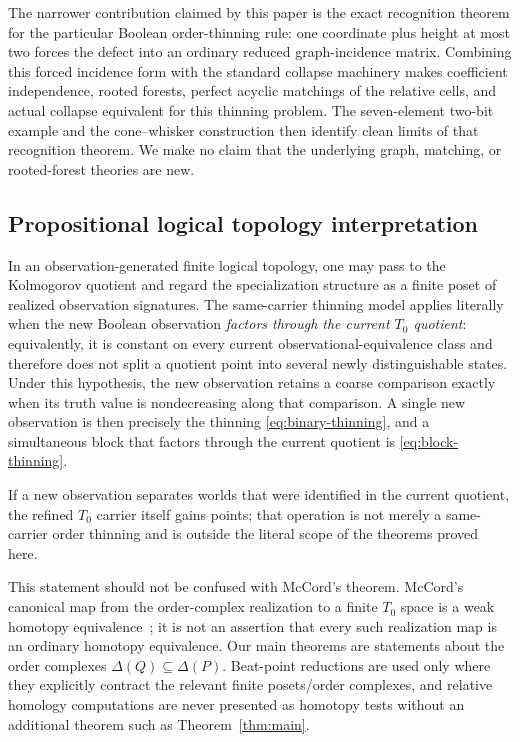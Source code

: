 \documentclass[11pt]{article}
\theoremstyle{definition}
\theoremstyle{remark}
\newcommand{\D}{\Delta}
\begin{document}
The narrower contribution claimed by this paper is the exact recognition theorem
for the particular Boolean order-thinning rule: one coordinate plus height at most two
forces the defect into an ordinary reduced graph-incidence matrix.  Combining this
forced incidence form with the standard collapse machinery makes coefficient
independence, rooted forests, perfect acyclic matchings of the relative cells, and
actual collapse equivalent for this thinning problem.  The seven-element two-bit example and the cone--whisker construction
then identify clean limits of that recognition theorem.  We make no claim that the
underlying graph, matching, or rooted-forest theories are new.

\subsection{Propositional logical topology interpretation}

In an observation-generated finite logical topology, one may pass to the Kolmogorov
quotient and regard the specialization structure as a finite poset of realized
observation signatures.  The same-carrier thinning model applies literally when the
new Boolean observation \emph{factors through the current $T_0$ quotient}: equivalently,
it is constant on every current observational-equivalence class and therefore does
not split a quotient point into several newly distinguishable states.  Under this
hypothesis, the new observation retains a coarse comparison exactly when its truth
value is nondecreasing along that comparison.  A single new observation is then
precisely the thinning \eqref{eq:binary-thinning}, and a simultaneous block that
factors through the current quotient is \eqref{eq:block-thinning}.

If a new observation separates worlds that were identified in the current quotient,
the refined $T_0$ carrier itself gains points; that operation is not merely a
same-carrier order thinning and is outside the literal scope of the theorems proved
here.

This statement should not be confused with McCord's theorem.  McCord's canonical map
from the order-complex realization to a finite $T_0$ space is a weak homotopy
equivalence~\cite{McCord1966}; it is not an assertion that every such realization map
is an ordinary homotopy equivalence.  Our main theorems are statements about the
order complexes $\D(Q)\subseteq\D(P)$.  Beat-point reductions are used only where they
explicitly contract the relevant finite posets/order complexes, and relative homology
computations are never presented as homotopy tests without an additional theorem such
as Theorem~\ref{thm:main}.
\end{document}
